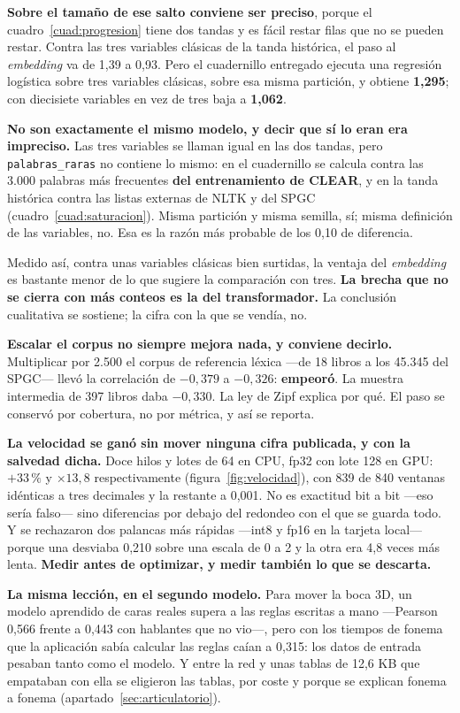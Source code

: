 \documentclass[11pt,a4paper]{article}
\newcommand{\cod}[1]{\texttt{\small #1}}
\newcommand{\pct}{\,\%}
\begin{document}
\textbf{Sobre el tamaño de ese salto conviene ser preciso}, porque el
cuadro~\ref{cuad:progresion} tiene dos tandas y es fácil restar filas que no se pueden
restar. Contra las tres variables clásicas de la tanda histórica, el paso al
\emph{embedding} va de 1,39 a 0,93. Pero el cuadernillo entregado ejecuta una regresión
logística sobre tres variables clásicas, sobre esa misma partición, y obtiene
\textbf{1,295}; con diecisiete variables en vez de tres baja a \textbf{1,062}.

\textbf{No son exactamente el mismo modelo, y decir que sí lo eran era impreciso.} Las
tres variables se llaman igual en las dos tandas, pero \cod{palabras\_raras} no contiene
lo mismo: en el cuadernillo se calcula contra las 3.000 palabras más frecuentes
\textbf{del entrenamiento de CLEAR}, y en la tanda histórica contra las listas externas de
NLTK y del SPGC (cuadro~\ref{cuad:saturacion}). Misma partición y misma semilla, sí; misma
definición de las variables, no. Esa es la razón más probable de los 0,10 de diferencia.

Medido así, contra unas variables clásicas bien surtidas, la ventaja del \emph{embedding}
es bastante menor de lo que sugiere la
comparación con tres. \textbf{La brecha que no se cierra con más conteos es la del
transformador.} La conclusión cualitativa
se sostiene; la cifra con la que se vendía, no.

\textbf{Escalar el corpus no siempre mejora nada, y conviene decirlo.} Multiplicar por
2.500 el corpus de referencia léxica —de 18 libros a los 45.345 del SPGC— llevó la
correlación de $-0{,}379$ a $-0{,}326$: \textbf{empeoró}. La muestra intermedia de 397
libros daba $-0{,}330$. La ley de Zipf explica por qué. El paso se
conservó por cobertura, no por métrica, y así se reporta.

\textbf{La velocidad se ganó sin mover ninguna cifra publicada, y con la salvedad dicha.}
Doce
hilos y lotes de 64 en CPU, fp32 con lote 128 en GPU: $+33\pct$ y $\times 13{,}8$
respectivamente (figura~\ref{fig:velocidad}), con 839 de 840 ventanas idénticas a tres
decimales y la restante a 0,001. No es exactitud bit a bit —eso sería falso— sino
diferencias por debajo del redondeo con el que se guarda todo. Y se
rechazaron dos palancas más rápidas —int8 y fp16 en la tarjeta local— porque una desviaba
0,210 sobre una escala de 0 a 2 y la otra era 4,8 veces más lenta. \textbf{Medir antes de
optimizar, y medir también lo que se descarta.}

\textbf{La misma lección, en el segundo modelo.} Para mover la boca 3D, un modelo aprendido
de caras reales supera a las reglas escritas a mano ---Pearson 0,566 frente a 0,443 con
hablantes que no vio---, pero con los tiempos de fonema que la aplicación sabía calcular las
reglas caían a 0,315: los datos de entrada pesaban tanto como el modelo. Y entre la red y
unas tablas de 12,6 KB que empataban con ella se eligieron las tablas, por coste y porque se
explican fonema a fonema (apartado~\ref{sec:articulatorio}).
\end{document}
